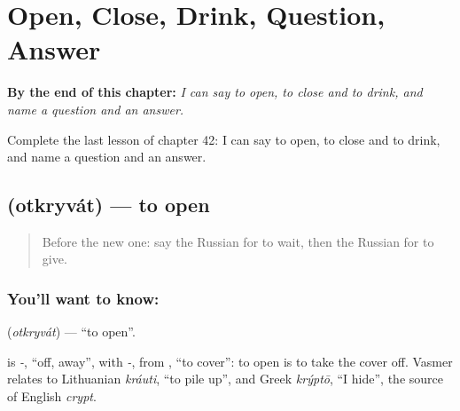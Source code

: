 
\chapter{Open, Close, Drink, Question, Answer}
\label{ch:ru-open-close-drink-question-answer}

\begin{chapteropening}
\textbf{By the end of this chapter:} \emph{I can say to open, to close and to drink, and name a question and an answer.}

Complete the last lesson of chapter 42: I can say to open, to close and to drink, and name a question and an answer.
\end{chapteropening}

\section[\texorpdfstring{\ru{открывать} (otkryvát)}{открывать (otkryvát)}]{ (otkryvát) — to open}

\label{lesson:RU-C42-otkryvat}



\begin{quote}
Before the new one: say the Russian for to wait, then the Russian for to give.
\end{quote}

\subsection*{You'll want to know: }
\textbf{} (\emph{otkryvát}) — \textquotedblleft{}to open\textquotedblright{}.

\begin{cousinweb}
\textbf{} is \emph{-}, \textquotedblleft{}off, away\textquotedblright{}, with \emph{-}, from \emph{}, \textquotedblleft{}to cover\textquotedblright{}: to open is to take the cover off. Vasmer relates \emph{} to Lithuanian \emph{kráuti}, \textquotedblleft{}to pile up\textquotedblright{}, and Greek \emph{krýptō}, \textquotedblleft{}I hide\textquotedblright{}, the source of English \emph{crypt}.
\end{cousinweb}


